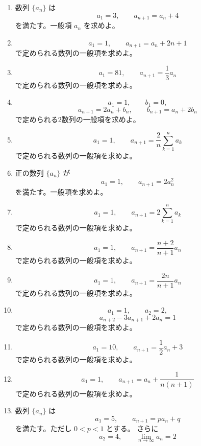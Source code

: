 \begin{enumerate}[label=\textbf{問\arabic*.},leftmargin=3.8em,format=\bookitemlink{practice-basic}{problem}{answer}]
\[          \]
              で定められる数列の一般項を求めよ。
        \item 数列 \(\{a_n\}\) は
          \[
            a_1=3,\qquad a_{n+1}=a_n+4
          \]
              を満たす。一般項 \(a_n\) を求めよ。
        \item \[
            a_1=1,\qquad a_{n+1}=a_n+2n+1
          \]
              で定められる数列の一般項を求めよ。
        \item \[
            a_1=81,\qquad a_{n+1}=\frac13a_n
          \]
              で定められる数列の一般項を求めよ。
        \item \[
            a_1=1,\qquad b_1=0,
          \]
          \[
            a_{n+1}=2a_n+b_n,\qquad
            b_{n+1}=a_n+2b_n
          \]
              で定められる2数列の一般項を求めよ。
        \item \[
            a_1=1,\qquad
            a_{n+1}=\frac2n\sum_{k=1}^{n}a_k
          \]
              で定められる数列の一般項を求めよ。
        \item 正の数列 \(\{a_n\}\) が
          \[
            a_1=1,\qquad a_{n+1}=2a_n^2
          \]
              を満たす。一般項を求めよ。
        \item \[
            a_1=1,\qquad
            a_{n+1}=2\sum_{k=1}^{n}a_k
          \]
              で定められる数列の一般項を求めよ。
        \item \[
            a_1=1,\qquad
            a_{n+1}=\frac{n+2}{n+1}a_n
          \]
              で定められる数列の一般項を求めよ。
        \item \[
            a_1=1,\qquad
            a_{n+1}=\frac{2n}{n+1}a_n
          \]
              で定められる数列の一般項を求めよ。
        \item \[
            a_1=1,\qquad a_2=2,
          \]
          \[
            a_{n+2}-3a_{n+1}+2a_n=1
          \]
              で定められる数列の一般項を求めよ。
        \item \[
            a_1=10,\qquad
            a_{n+1}=\frac12a_n+3
          \]
              で定められる数列の一般項を求めよ。
        \item \[
            a_1=1,\qquad
            a_{n+1}=a_n+\frac1{n(n+1)}
          \]
              で定められる数列の一般項を求めよ。
        \item 数列 \(\{a_n\}\) は
          \[
            a_1=5,\qquad a_{n+1}=pa_n+q
          \]
              を満たす。ただし \(0<p<1\) とする。
              さらに
          \[
            a_2=4,\qquad \lim_{n\to\infty}a_n=2
          \]

\end{enumerate}
